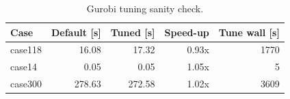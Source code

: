 \begin{table}[t]\centering
\caption{Gurobi tuning sanity check.}
\label{tab:grbtune}
\small
\begin{tabular}{|l|r|r|r|r|}
\hline
\textbf{Case} & \textbf{Default [s]} & \textbf{Tuned [s]} & \textbf{Speed-up} & \textbf{Tune wall [s]} \\
\hline
case118 & 16.08 & 17.32 & 0.93x & 1770 \\
case14 & 0.05 & 0.05 & 1.05x & 5 \\
case300 & 278.63 & 272.58 & 1.02x & 3609 \\
\hline
\end{tabular}
\end{table}
